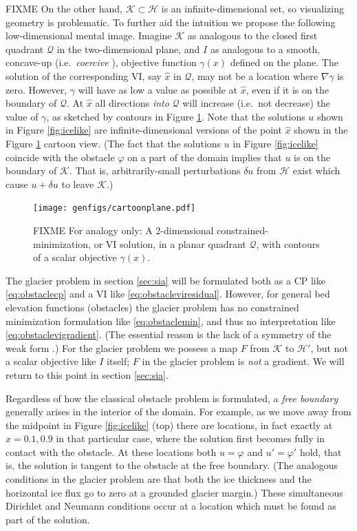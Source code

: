 \documentclass[letterpaper,final,12pt,reqno]{amsart}
\theoremstyle{claim}
\numberwithin{equation}{section}
\numberwithin{figure}{section}
\numberwithin{table}{section}
\numberwithin{theorem}{section}
\begin{document}
FIXME On the other hand, $\mathcal{K} \subset \mathcal{H}$ is an infinite-dimensional set, so visualizing geometry is problematic.  To further aid the intuition we propose the following low-dimensional mental image.  Imagine $\mathcal{K}$ as analogous to the closed first quadrant $\mathcal{Q}$ in the two-dimensional plane, and $I$ as analogous to a smooth, concave-up (i.e.~\emph{coercive} \cite{Evans2010}), objective function $\gamma(x)$ defined on the plane.  The solution of the corresponding VI, say $\hat x$ in $\mathcal{Q}$, may not be a location where $\nabla \gamma$ is zero.  However, $\gamma$ will have as low a value as possible at $\hat x$, even if it is on the boundary of $\mathcal{Q}$.  At $\hat x$ all directions \emph{into} $\mathcal{Q}$ will increase (i.e.~not decrease) the value of $\gamma$, as sketched by contours in Figure \ref{fig:cartoonplane}.  Note that the solutions $u$ shown in Figure \ref{fig:icelike} are infinite-dimensional versions of the point $\hat x$ shown in the Figure \ref{fig:cartoonplane} cartoon view.  (The fact that the solutions $u$ in Figure \ref{fig:icelike} coincide with the obstacle $\varphi$ on a part of the domain implies that $u$ is on the boundary of $\mathcal{K}$.  That is, arbitrarily-small perturbations $\delta u$ from $\mathcal{H}$ exist which cause $u+\delta u$ to leave $\mathcal{K}$.)

\begin{figure}
\texttt{[image: genfigs/cartoonplane.pdf]}
\caption{FIXME For analogy only:  A 2-dimensional constrained-minimization, or VI solution, in a planar quadrant $\mathcal{Q}$, with contours of a scalar objective $\gamma(x)$.}
\label{fig:cartoonplane}
\end{figure}

The glacier problem in section \ref{sec:sia} will be formulated both as a CP like \eqref{eq:obstaclecp} and a VI like \eqref{eq:obstacleviresidual}.  However, for general bed elevation functions (obstacles) the glacier problem has no constrained minimization formulation like \eqref{eq:obstaclemin}, and thus no interpretation like \eqref{eq:obstaclevigradient}.  (The essential reason is the lack of a symmetry of the weak form \cite{JouvetBueler2012}.)  For the glacier problem we possess a map $F$ from $\mathcal{K}$ to $\mathcal{H}'$, but not a scalar objective like $I$ itself; $F$ in the glacier problem is \emph{not} a gradient.  We will return to this point in section \ref{sec:sia}.

Regardless of how the classical obstacle problem is formulated, a \emph{free boundary} generally arises in the interior of the domain.  For example, as we move away from the midpoint in Figure \ref{fig:icelike} (top) there are locations, in fact exactly at $x=0.1,0.9$ in that particular case, where the solution first becomes fully in contact with the obstacle.  At these locations both $u=\varphi$ and $u'=\varphi'$ hold, that is, the solution is tangent to the obstacle at the free boundary.  (The analogous conditions in the glacier problem are that both the ice thickness and the horizontal ice flux go to zero at a grounded glacier margin.)  These simultaneous Dirichlet and Neumann conditions occur at a location which must be found as part of the solution.
\end{document}
